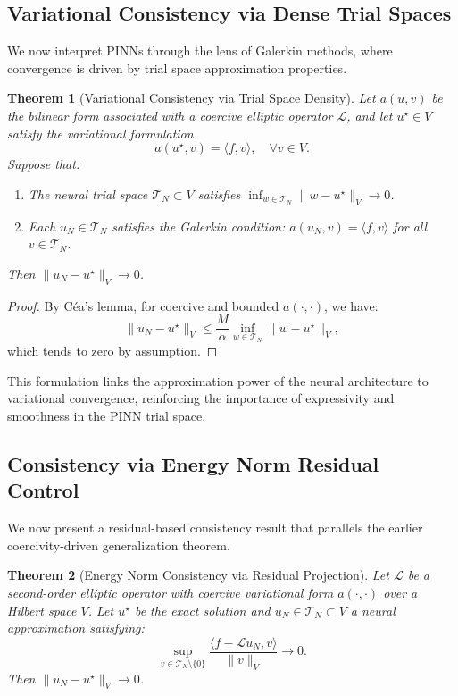 \documentclass[11pt, a4paper]{article}
\newtheorem{thm}{Theorem}
\begin{document}
\subsection{Variational Consistency via Dense Trial Spaces}

We now interpret PINNs through the lens of Galerkin methods, where convergence is driven by trial space approximation properties.

\begin{thm}[Variational Consistency via Trial Space Density]
Let $a(u,v)$ be the bilinear form associated with a coercive elliptic operator $\mathcal{L}$, and let $u^\star \in V$ satisfy the variational formulation
\[
a(u^\star, v) = \langle f, v \rangle, \quad \forall v \in V.
\]
Suppose that:
\begin{enumerate}
\item The neural trial space $\mathcal{T}_N \subset V$ satisfies $\inf_{w \in \mathcal{T}_N} \| w - u^\star \|_V \to 0$.
\item Each $u_N \in \mathcal{T}_N$ satisfies the Galerkin condition: $a(u_N, v) = \langle f, v \rangle$ for all $v \in \mathcal{T}_N$.
\end{enumerate}
Then $\| u_N - u^\star \|_V \to 0$.
\end{thm}

\begin{proof}
By Céa’s lemma, for coercive and bounded $a(\cdot,\cdot)$, we have:
\[
\| u_N - u^\star \|_V \leq \frac{M}{\alpha} \inf_{w \in \mathcal{T}_N} \| w - u^\star \|_V,
\]
which tends to zero by assumption.
\end{proof}

This formulation links the approximation power of the neural architecture to variational convergence, reinforcing the importance of expressivity and smoothness in the PINN trial space.

\subsection{Consistency via Energy Norm Residual Control}

We now present a residual-based consistency result that parallels the earlier coercivity-driven generalization theorem.

\begin{thm}[Energy Norm Consistency via Residual Projection]
Let $\mathcal{L}$ be a second-order elliptic operator with coercive variational form $a(\cdot,\cdot)$ over a Hilbert space $V$. Let $u^\star$ be the exact solution and $u_N \in \mathcal{T}_N \subset V$ a neural approximation satisfying:
\[
\sup_{v \in \mathcal{T}_N \setminus \{0\}} \frac{ \langle f - \mathcal{L} u_N, v \rangle }{ \| v \|_V } \to 0.
\]
Then $\| u_N - u^\star \|_V \to 0$.
\end{thm}
\end{document}
